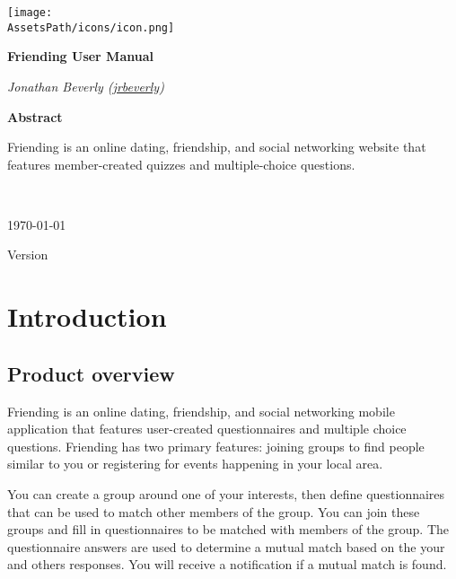 \documentclass[a4paper,11pt,titlepage]{scrartcl}
\newcommand{\textapp}[1]{{\fontfamily{cmss}\selectfont#1}}
\newcommand{\Friending}{\textapp{Friending}}
\newcommand*{\AssetsPath}{../assets}%
\begin{document}
%

\begin{titlepage}
	\centering
	\texttt{[image: \\AssetsPath/icons/icon.png]}\\
	\vspace{1.5cm}
	{\huge\bfseries Friending User Manual\par}
	\vspace{2cm}
	{\Large\itshape Jonathan Beverly (\href{jrbeverly.me}{jrbeverly})\par}
	\vfill
	{\large\textbf{Abstract}\par}
	\begin{paragraph} 
	\Friending{} is an online dating, friendship, and social networking website that features member-created quizzes and multiple-choice questions.  
	\end{paragraph}
	\\\vspace{0.5cm}
	{\large \today\par}
	\vspace{0.25cm}
	{\small Version }
\end{titlepage}

%

\clearpage
\tableofcontents

%

\clearpage
\listoffigures

%

\clearpage
\section{Introduction}
\label{sec:introduction}

\subsection{Product overview}
\label{sec:overview}

\Friending{} is an online dating, friendship, and social networking mobile application that features user-created questionnaires and multiple choice questions.  \Friending{} has two primary features: joining groups to find people similar to you or registering for events happening in your local area.

You can create a group around one of your interests, then define questionnaires that can be used to match other members of the group.  You can join these groups and fill in questionnaires to be matched with members of the group.  The questionnaire answers are used to determine a mutual match based on the your and others responses.  You will receive a notification if a mutual match is found.
\end{document}

